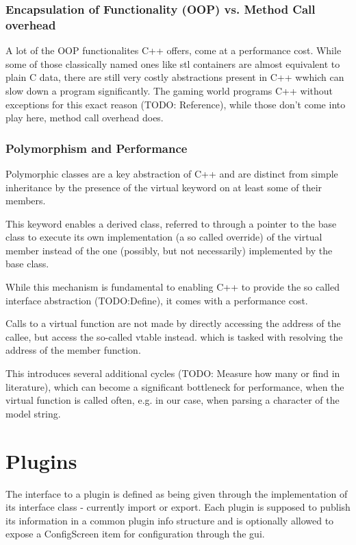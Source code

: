 \subsubsection{Encapsulation of Functionality (OOP) vs. Method Call overhead}
A lot of the OOP functionalites C++ offers, come at a performance cost.
While some of those classically named ones like stl containers are almost equivalent to plain C data, there are still very costly abstractions present in C++ wwhich can slow down a program significantly.
The gaming world programs C++ without exceptions for this exact reason (TODO: Reference), while those don't come into play here, method call overhead does.

\subsubsection{Polymorphism and Performance}
Polymorphic classes are a key abstraction of C++ and are distinct from simple inheritance by the presence of the virtual keyword on at least some of their members.

This keyword enables a derived class, referred to through a pointer to the base class to execute its own implementation (a so called override) of the virtual member instead of the one (possibly, but not necessarily) implemented by the base class.

While this mechanism is fundamental to enabling C++ to provide the so called interface abstraction (TODO:Define), it comes with a performance cost.

Calls to a virtual function are not made by directly accessing the address of the callee, but access the so-called vtable instead. which is tasked with resolving the address of the member function.

This introduces several additional cycles (TODO: Measure how many or find in literature), which can become a significant bottleneck for performance, when the virtual function is called often, e.g. in our case, when parsing a character of the model string.

\section{Plugins}
The interface to a plugin is defined as being given through the implementation of its interface class - currently import or export. Each plugin is supposed to publish its information in a common plugin info structure and is optionally allowed to expose a ConfigScreen item for configuration through the \gls{gui}.

